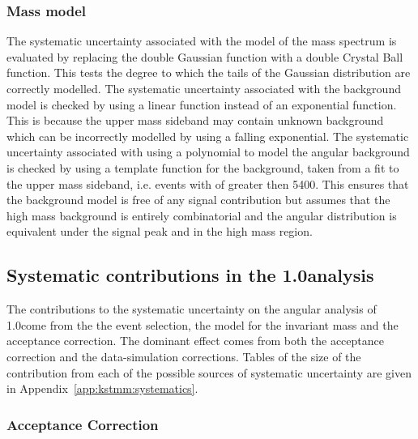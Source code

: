 \subsubsection{Mass model}

The systematic uncertainty associated with the model of the \Bd mass spectrum is evaluated by
 replacing the double Gaussian function with a double Crystal Ball function.
This tests the degree to which the tails of the Gaussian distribution are correctly modelled.
The systematic uncertainty associated with the background model is checked by using a linear function instead of an exponential function.
This is because the upper mass sideband may contain unknown background which can be incorrectly modelled by using a falling exponential.
The systematic uncertainty associated with using a polynomial to model the angular background is checked by
using a template function for the background, taken from a fit to the \Bd upper mass sideband, i.e. events with \mB of greater then 5400\mevmevcccc.
This ensures that the background model is free of any signal contribution but assumes that the high mass background is entirely combinatorial 
and the angular distribution is equivalent under the signal peak and in the high mass region.


\subsection{Systematic contributions in the 1.0\invfb analysis}

The contributions to the systematic uncertainty on the angular analysis of 1.0\invfb come from the 
the event selection, the model for the \Bd invariant mass and the acceptance correction.
The dominant effect comes from both the acceptance correction and the data-simulation corrections.
Tables of the size of the contribution from each of the possible sources of systematic uncertainty are given in Appendix~\ref{app:kstmm:systematics}.

\subsubsection{ Acceptance Correction}


